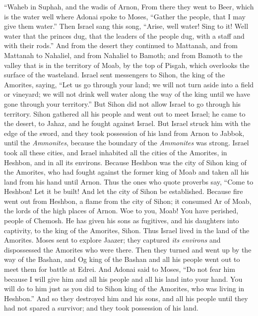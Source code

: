 \begin{biblechapter}
\verse “Waheb in Suphah, 
and the wadis of Arnon,
\verse From there they went to Beer, which is the water well where Adonai spoke to Moses, “Gather the people, that I may give them water.”
\verse Then Israel sang this song, “Arise, well water! Sing to it!
\verse Well water that the princes dug, that the leaders of the people dug, with a staff and with their rods.” And from the desert they continued to Mattanah,
\verse and from Mattanah to Nahaliel, and from Nahaliel to Bamoth;
\verse and from Bamoth to the valley that is in the territory of Moab, by the top of Pisgah, which overlooks the surface of the wasteland.
 Israel sent messengers to Sihon, the king of the Amorites, saying,
\verse “Let us go through your land; we will not turn aside into a field or vineyard; we will not drink well water along the way of the king until we have gone through your territory.”
\verse But Sihon did not allow Israel to go through his territory. Sihon gathered all his people and went out to meet Israel; he came to the desert, to Jahaz, and he fought against Israel.
\verse But Israel struck him with the edge of the sword, and they took possession of his land from Arnon to Jabbok, until the \textit{Ammonites}, because the boundary of the \textit{Ammonites} was strong.
\verse Israel took all these cities, and Israel inhabited all the cities of the Amorites, in Heshbon, and in all its environs.
\verse Because Heshbon was the city of Sihon king of the Amorites, who had fought against the former king of Moab and taken all his land from his hand until Arnon.
\verse Thus the ones who quote proverbs say,
\verse “Come to Heshbon! Let it be built! 
And let the city of Sihon be established.
\verse Because fire went out from Heshbon, 
a flame from the city of Sihon; 
it consumed Ar of Moab, 
the lords of the high places of Arnon.
\verse Woe to you, Moab! 
You have perished, people of Chemosh. 
He has given his sons as fugitives, 
and his daughters into captivity, 
to the king of the Amorites, Sihon.
\verse Thus Israel lived in the land of the Amorites.
\verse Moses sent to explore Jaazer; they captured \textit{its environs} and dispossessed the Amorites who were there.
\verse Then they turned and went up by the way of the Bashan, and Og king of the Bashan and all his people went out to meet them for battle at Edrei.
\verse And Adonai said to Moses, “Do not fear him because I will give him and all his people and all his land into your hand. You will do to him just as you did to Sihon king of the Amorites, who was living in Heshbon.”
\verse And so they destroyed him and his sons, and all his people until they had not spared a survivor; and they took possession of his land.
\end{biblechapter}

